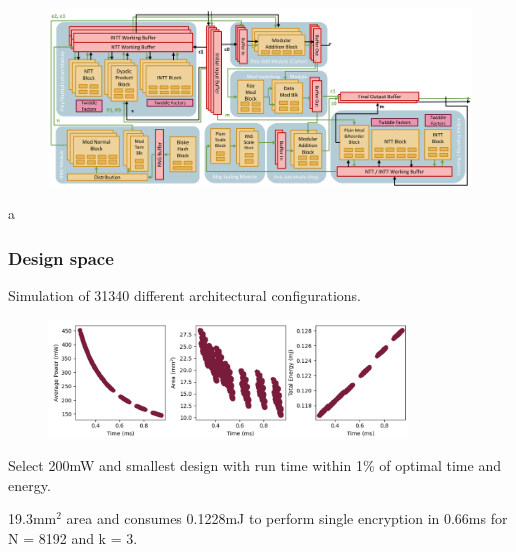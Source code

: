 \documentclass[10pt,handout]{beamer}
\begin{document}
\begin{frame}
{\begin{figure}
        \includegraphics[width=1.05\textwidth]{architecture3.png}
    \end{figure}
}



\end{frame}




\begin{frame}a
\frametitle{Design space}
Simulation of 31340 different architectural configurations.
\begin{figure}
    \includegraphics[width=0.85\textwidth]{design-space.png}
\end{figure}
Select 200mW and smallest design with run time within 1\% of optimal time and energy.

19.3mm$^2$ area and consumes 0.1228mJ to perform single encryption in 0.66ms for N = 8192 and k = 3.
\end{frame}
\end{document}

